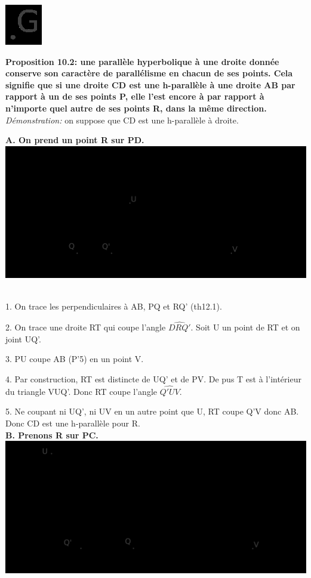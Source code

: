\documentclass[a4paper, 12pt, twoside]{book}
\begin{document}
         
  \includegraphics[scale=0.5]{figures/Lobat1.eps}\
        
        
        
 \newpage \textbf{Proposition 10.2: une parallèle hyperbolique à une droite donnée conserve son caractère de parallélisme en chacun de ses points. Cela signifie que si une droite CD est une h-parallèle à une droite AB par rapport à un de ses points P, elle l'est encore à par rapport à n'importe quel autre de ses points R, dans la même direction.}\\
 
 \textit{Démonstration:} on suppose que CD est une h-parallèle à droite. \
 
 \textbf{A. On prend un point R sur PD. }\\
 
   \includegraphics[scale=0.2]{figures/Lobat6.eps}\
   
   1. On trace les perpendiculaires à AB, PQ et RQ' (th12.1).
 
 2.  On trace une droite RT qui coupe l'angle $\hat{DRQ'}$. Soit U un point de RT et on joint UQ'.\
 
 
 3. PU coupe AB (P'5) en un point V. \
 
 4. Par construction, RT est distincte de UQ' et de PV. De pus T est à l'intérieur du triangle VUQ'. Donc RT coupe l'angle $\hat{Q'UV}$.\
 
 5. Ne coupant ni UQ', ni UV en un autre point que U, RT coupe Q'V donc AB. Donc CD est une h-parallèle pour R.\\
 
 \textbf{B. Prenons R sur PC.}\\
 
 
   \includegraphics[scale=0.2]{figures/Lobat7.eps}\
 
\end{document}
